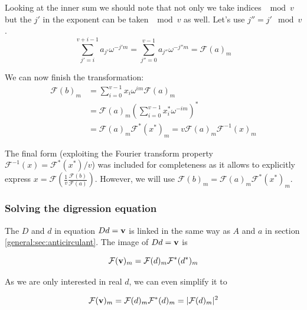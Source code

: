         Looking at the inner sum we should note that not only we take indices $\mod v$ but the $j'$ in the exponent can be taken $\mod v$ as well. Let's use $j'' = j' \mod v$.
        \begin{equation}
            \sum_{j'=i}^{v+i-1} a_{j'} \omega^{-j'm} = 
            \sum_{j''=0}^{v-1} a_{j''} \omega^{-j''m}= \mathcal{F}(a)_m
        \end{equation}
        
        We can now finish the transformation:
        \begin{equation}
        \begin{split}
            \mathcal{F} (b)_m
            &= \sum_{i=0}^{v-1} x_i \omega^{im} \mathcal{F}(a)_m \\
            &= \mathcal{F}(a)_m (\sum_{i=0}^{v-1} x^*_i \omega^{-im})^* \\
            &= \mathcal{F}(a)_m \mathcal{F}^*(x^*)_m 
            = v \mathcal{F}(a)_m \mathcal{F}^{-1}(x)_m
        \end{split}
        \end{equation}
        
        The final form (exploiting the Fourier transform property $\mathcal{F}^{-1}(x) = \mathcal{F}^*(x^*)/v$) was included for completeness as it allows to explicitly express $x = \mathcal{F} \left(\frac1v \frac{\mathcal{F}(b)}{\mathcal{F}(a)} \right)$. However, we will use $\mathcal{F} (b)_m = \mathcal{F}(a)_m \mathcal{F}^*(x^*)_m$.
    
    \subsubsection{Solving the digression equation}
        The $D$ and $d$ in equation $Dd=\bf v$ is linked in the same way as $A$ and $a$ in section \ref{general:sec:anticirculant}. The image of $Dd=\bf v$ is
        
        \begin{equation}
            \mathcal{F} ({\bf v})_m = \mathcal{F}(d)_m \mathcal{F^*}(d^*)_m
        \end{equation}

        As we are only interested in real $d$, we can even simplify it to
        
        \begin{equation}
            \label{general:eq:dfourier}
            \mathcal{F} ({\bf v})_m = \mathcal{F}(d)_m \mathcal{F^*}(d)_m = |\mathcal{F}(d)_m|^2
        \end{equation}
        
